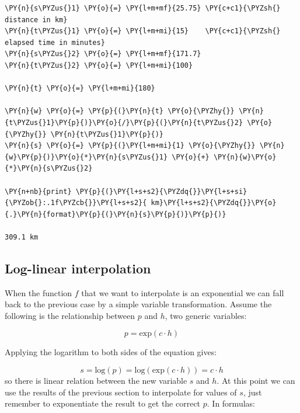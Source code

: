 \begin{tcolorbox}[breakable, size=fbox, boxrule=1pt, pad at break*=1mm,colback=cellbackground, colframe=cellborder]
\begin{Verbatim}[commandchars=\\\{\}]
\PY{n}{s\PYZus{}1} \PY{o}{=} \PY{l+m+mf}{25.75} \PY{c+c1}{\PYZsh{} distance in km}
\PY{n}{t\PYZus{}1} \PY{o}{=} \PY{l+m+mi}{15}    \PY{c+c1}{\PYZsh{} elapsed time in minutes}
\PY{n}{s\PYZus{}2} \PY{o}{=} \PY{l+m+mf}{171.7}
\PY{n}{t\PYZus{}2} \PY{o}{=} \PY{l+m+mi}{100}

\PY{n}{t} \PY{o}{=} \PY{l+m+mi}{180}

\PY{n}{w} \PY{o}{=} \PY{p}{(}\PY{n}{t} \PY{o}{\PYZhy{}} \PY{n}{t\PYZus{}1}\PY{p}{)}\PY{o}{/}\PY{p}{(}\PY{n}{t\PYZus{}2} \PY{o}{\PYZhy{}} \PY{n}{t\PYZus{}1}\PY{p}{)}
\PY{n}{s} \PY{o}{=} \PY{p}{(}\PY{l+m+mi}{1} \PY{o}{\PYZhy{}} \PY{n}{w}\PY{p}{)}\PY{o}{*}\PY{n}{s\PYZus{}1} \PY{o}{+} \PY{n}{w}\PY{o}{*}\PY{n}{s\PYZus{}2}

\PY{n+nb}{print} \PY{p}{(}\PY{l+s+s2}{\PYZdq{}}\PY{l+s+si}{\PYZob{}:.1f\PYZcb{}}\PY{l+s+s2}{ km}\PY{l+s+s2}{\PYZdq{}}\PY{o}{.}\PY{n}{format}\PY{p}{(}\PY{n}{s}\PY{p}{)}\PY{p}{)}

309.1 km
\end{Verbatim}
\end{tcolorbox}

\subsection{Log-linear interpolation}\label{log-linear-interpolation}
When the function $f$ that we want to interpolate is an exponential we can fall back to the previous case by a simple variable transformation. 
Assume the following is the relationship between $p$ and $h$, two generic variables:

\begin{equation}
p = \mathrm{exp}(c \cdot h)
\end{equation}

Applying the logarithm to both sides of the equation gives:

\begin{equation}
s = \mathrm{log}(p) = \mathrm{log}(\mathrm{exp}(c \cdot h)) = c \cdot h
\end{equation}
so there is linear relation between the new variable $s$ and $h$. At this point we can use the results of the previous section to interpolate for values of $s$, just remember to exponentiate the result to get the correct $p$. In formulas:

